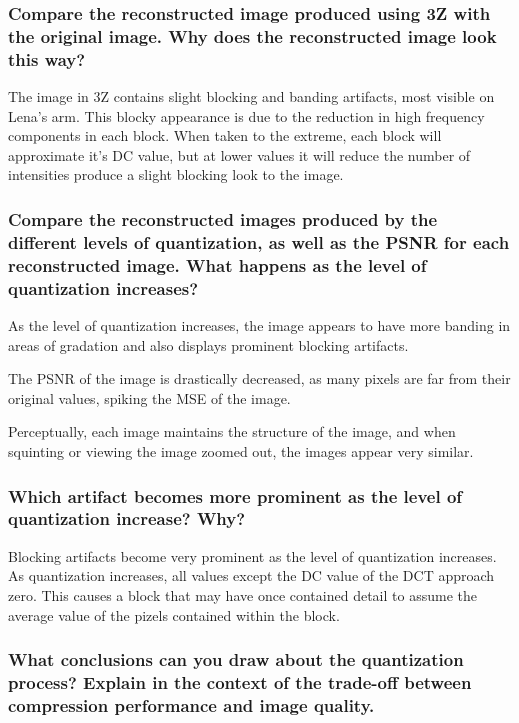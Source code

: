 \subsubsection{Compare the reconstructed image produced using 3Z with the original image. Why does the reconstructed image look this way?}

The image in 3Z contains slight blocking and banding artifacts, most visible on Lena's arm. This blocky appearance is due to the reduction in high frequency components in each block. When taken to the extreme, each block will approximate it's DC value, but at lower values it will reduce the number of intensities produce a slight blocking look to the image.

\subsubsection{Compare the reconstructed images produced by the different levels of quantization, as well as the PSNR for each reconstructed image. What happens as the level of quantization increases?}

As the level of quantization increases, the image appears to have more banding in areas of gradation and also displays prominent blocking artifacts.

The PSNR of the image is drastically decreased, as many pixels are far from their original values, spiking the MSE of the image.

Perceptually, each image maintains the structure of the image, and when squinting or viewing the image zoomed out, the images appear very similar.

\subsubsection{Which artifact becomes more prominent as the level of quantization increase? Why?}

Blocking artifacts become very prominent as the level of quantization increases. As quantization increases, all values except the DC value of the DCT approach zero. This causes a block that may have once contained detail to assume the average value of the pizels contained within the block.

\subsubsection{What conclusions can you draw about the quantization process? Explain in the context of the trade-off between compression performance and image quality.}


